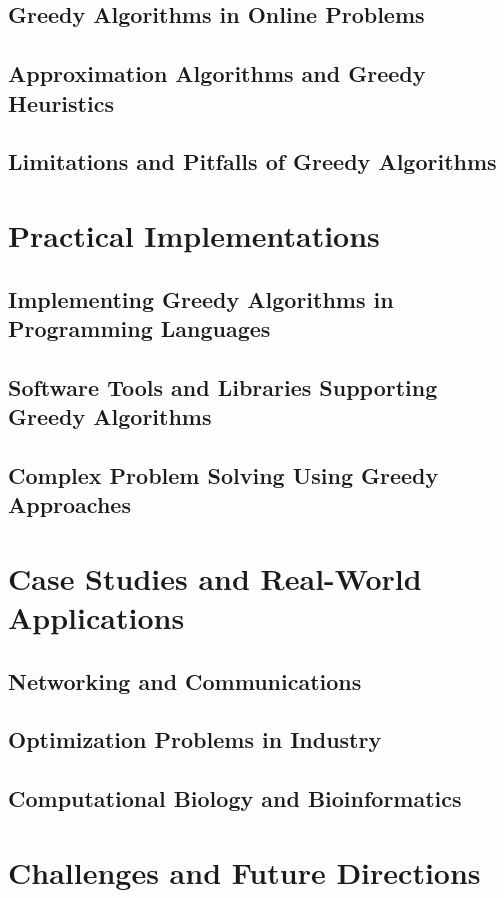 \documentclass[12pt]{book} %
\begin{document}
\subsection{Greedy Algorithms in Online Problems}
\subsection{Approximation Algorithms and Greedy Heuristics}
\subsection{Limitations and Pitfalls of Greedy Algorithms}

\section{Practical Implementations}
\subsection{Implementing Greedy Algorithms in Programming Languages}
\subsection{Software Tools and Libraries Supporting Greedy Algorithms}
\subsection{Complex Problem Solving Using Greedy Approaches}

\section{Case Studies and Real-World Applications}
\subsection{Networking and Communications}
\subsection{Optimization Problems in Industry}
\subsection{Computational Biology and Bioinformatics}

\section{Challenges and Future Directions}
\end{document}

